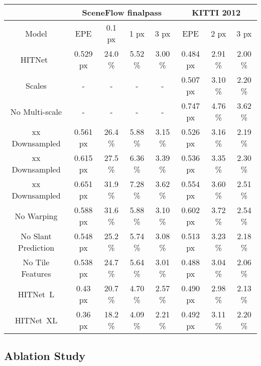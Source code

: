 \documentclass[final]{cvpr}
\newcommand{\algoname}{HITNet}
\begin{document}
\begin{table*}[htb]
\begin{center}
\begin{tabular}{|c|c|c|c|c|c|c|c|}
\hline
&  \multicolumn{4}{c|}{ SceneFlow finalpass \cite{mayer2016large}} & \multicolumn{3}{c|}{ KITTI 2012 \cite{Geiger2012CVPR}} \\
\hline
Model & EPE & 0.1 px & 1 px & 3 px & EPE & 2 px & 3 px \\
\hline
\algoname \ & {0.529} px &  {24.0} \% & {5.52} \% &  {3.00} \%  &  {0.484 px}  &  {2.91} \% & {2.00} \% \\
 Scales  & - & - & - & - &  {0.507} px & {3.10} \% &  {2.20} \%\\
No Multi-scale & - & - & - & - &  {0.747} px & {4.76} \% & {3.62} \%\\
xx Downsampled & {0.561} px &  {26.4} \% & {5.88} \%  &  {3.15} \% &  {0.526} px & {3.16} \% & {2.19} \%\\
xx Downsampled & {0.615} px &  {27.5} \% & {6.36} \%  &  {3.39} \% &  {0.536} px & {3.35} \% & {2.30} \%\\
xx Downsampled & {0.651} px &  {31.9} \% & {7.28} \%  &  {3.62} \% &  {0.554} px & {3.60} \% & {2.51} \%\\
No Warping &  {0.588} px &  {31.6} \% & {5.88} \%  &  {3.10} \%  &  {0.602} px &  {3.72} \% &  {2.54} \% \\
No Slant Prediction & {0.548} px &  {25.2} \% & {5.74} \%  &  {3.08} \%  & {0.513} px &  {3.23} \%  & {2.18} \%\\
No Tile Features &  {0.538} px &  {24.7} \% & {5.64} \%  &  {3.01} \%  &  {0.488} px &  {3.04} \%  &  {2.06} \%\\
\hline
\algoname \ L & {0.43} px & {20.7} \% & {4.70} \% & {2.57} \%  &  {0.490} px &  {2.98} \% &  {2.13} \% \\
\algoname \ XL & {0.36} px & {18.2} \% & {4.09} \% & {2.21} \%  &  {0.492} px &  {3.11} \% &  {2.20} \% \\
\hline
\end{tabular}
\end{center}
\caption{Ablation study of the proposed \algoname \ on SceneFlow \cite{mayer2016large} and KITTI 2012 \cite{Geiger2012CVPR} datasets. Lower is better.}
\label{tab:ablation}
\end{table*}

\subsection{Ablation Study}
\end{document}
